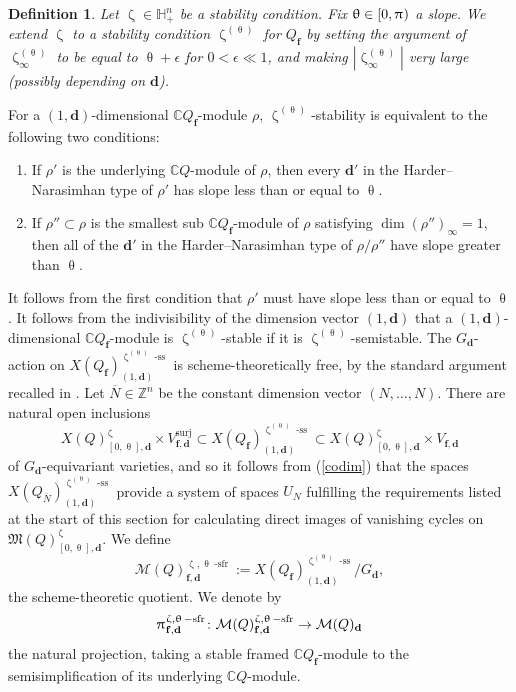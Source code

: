\documentclass[a4paper,10pt]{amsart}
\newtheorem{definition}[theorem]{Definition}
\newcommand{\dd}{\mathbf{d}}
\newcommand{\ff}{\mathbf{f}}
\DeclareMathOperator{\sfr}{-sfr}
\newcommand{\Mst}{\mathfrak{M}}
\newcommand{\Msp}{\mathcal{M}}
\renewcommand{\theta}{\uptheta}
\renewcommand{\zeta}{\upzeta}
\renewcommand{\pi}{\uppi\hspace{0.05em}}
\DeclareMathOperator{\sst}{-ss}
\DeclareMathOperator{\surj}{surj}
\begin{document}
\begin{definition}
\label{ztDef}
Let $\zeta\in\mathbb{H}_+^n$ be a stability condition.  Fix $\theta\in [0,\pi)$ a slope.  We extend $\zeta$ to a stability condition $\zeta^{(\theta)}$ for $Q_\ff$ by setting the argument of $\zeta^{(\theta)}_{\infty}$ to be equal to $\theta+\epsilon$ for $0<\epsilon\ll 1$, and making $|\zeta^{(\theta)}_{\infty}|$ very large (possibly depending on $\dd$).
\end{definition}
For a $(1,\dd)$-dimensional $\mathbb{C}Q_\ff$-module $\rho$, $\zeta^{(\theta)}$-stability is equivalent to the following two conditions:
\begin{enumerate}
\item
If $\rho'$ is the underlying $\mathbb{C}Q$-module of $\rho$, then every $\dd'$ in the Harder--Narasimhan type of $\rho'$ has slope less than or equal to $\theta$.
\item
If $\rho''\subset \rho$ is the smallest sub $\mathbb{C}Q_\ff$-module of $\rho$ satisfying $\dim(\rho'')_{\infty}=1$, then all of the $\dd'$ in the Harder--Narasimhan type of $\rho/\rho''$ have slope greater than $\theta$.
\end{enumerate}
It follows from the first condition that $\rho'$ must have slope less than or equal to $\theta$.  It follows from the indivisibility of the dimension vector $(1,\dd)$ that a $(1,\dd)$-dimensional $\mathbb{C}Q_\ff$-module is $\zeta^{(\theta)}$-stable if it is $\zeta^{(\theta)}$-semistable.  The $G_{\dd}$-action on $X(Q_{\ff})^{\zeta^{(\theta)}\sst}_{(1,\dd)}$ is scheme-theoretically free, by the standard argument recalled in \cite[Prop.3.7]{Efi11}.  Let $\overline{N}\in \mathbb{Z}^n$ be the constant dimension vector $(N,\ldots,N)$.  There are natural open inclusions 
\[
X(Q)_{[0,\theta],\dd}^{\zeta}\times V^{\surj}_{\ff,\dd}\subset X(Q_\ff)_{(1,\dd)}^{\zeta^{(\theta)}\sst}\subset X(Q)^{\zeta}_{[0, \theta],\dd}\times V_{\ff,\dd}
\]
of $G_{\dd}$-equivariant varieties, and so it follows from (\ref{codim}) that the spaces $X(Q_{\overline{N}})_{(1,\dd)}^{\zeta^{(\theta)}\sst}$ provide a system of spaces $U_N$ fulfilling the requirements listed at the start of this section for calculating direct images of vanishing cycles on $\Mst(Q)_{[0,\theta],\dd}^{\zeta}$.  We define 
\begin{equation}
\label{sfrIntro}
\Msp(Q)^{\zeta,\theta\sfr}_{\ff,\dd}:=X(Q_\ff)^{\zeta^{(\theta)}\sst}_{(1,\dd)}/G_{\dd},
\end{equation}
the scheme-theoretic quotient.  We denote by
\[
\pi^{\zeta,\theta\sfr}_{\ff,\dd}\colon \Msp(Q)^{\zeta,\theta\sfr}_{\ff, \dd}\rightarrow \Msp(Q)_{\dd}
\]
the natural projection, taking a stable framed $\mathbb{C}Q_{\ff}$-module to the semisimplification of its underlying $\mathbb{C}Q$-module.  
\end{document}
